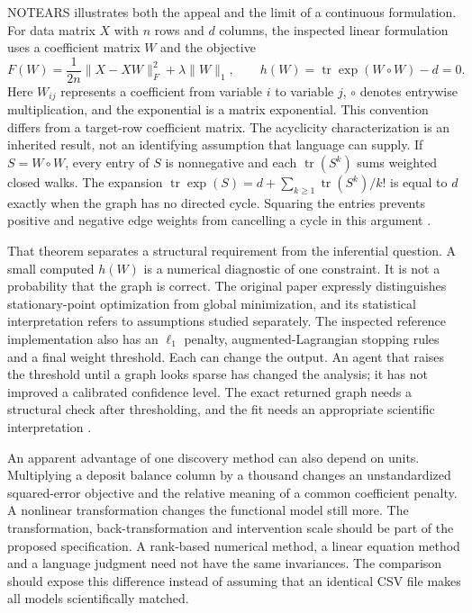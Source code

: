 NOTEARS illustrates both the appeal and the limit of a continuous formulation.
For data matrix $X$ with $n$ rows and $d$ columns, the inspected linear
formulation uses a coefficient matrix $W$ and the objective
\[
 F(W)=\frac{1}{2n}\lVert X-XW\rVert_F^2+\lambda\lVert W\rVert_1,
 \qquad h(W)=\operatorname{tr}\exp(W\circ W)-d=0.
\]
Here $W_{ij}$ represents a coefficient from variable $i$ to variable $j$,
$\circ$ denotes entrywise multiplication, and the exponential is a matrix
exponential. This convention differs from a target-row coefficient matrix.
The acyclicity characterization is an inherited result, not an identifying
assumption that language can supply. If $S=W\circ W$, every entry of $S$
is nonnegative and each $\operatorname{tr}(S^k)$ sums weighted closed walks.
The expansion $\operatorname{tr}\exp(S)=d+\sum_{k\geq1}
\operatorname{tr}(S^k)/k!$ is equal to $d$ exactly when the graph has no
directed cycle. Squaring the entries prevents positive and negative edge
weights from cancelling a cycle in this argument
\citep{notears2018}.

That theorem separates a structural requirement from the inferential question.
A small computed $h(W)$ is a numerical diagnostic of one constraint. It is
not a probability that the graph is correct. The original paper expressly
distinguishes stationary-point optimization from global minimization, and
its statistical interpretation refers to assumptions studied separately.
The inspected reference implementation also has an $\ell_1$ penalty,
augmented-Lagrangian stopping rules and a final weight threshold. Each can
change the output. An agent that raises the threshold until a graph looks
sparse has changed the analysis; it has not improved a calibrated confidence
level. The exact returned graph needs a structural check after thresholding,
and the fit needs an appropriate scientific interpretation
\citep{notears2018,exec13_pydisc_notears}.

An apparent advantage of one discovery method can also depend on units.
Multiplying a deposit balance column by a thousand changes an unstandardized
squared-error objective and the relative meaning of a common coefficient
penalty. A nonlinear transformation changes the functional model still more.
The transformation, back-transformation and intervention scale should be
part of the proposed specification. A rank-based numerical method, a linear
equation method and a language judgment need not have the same invariances.
The comparison should expose this difference instead of assuming that an
identical CSV file makes all models scientifically matched.

